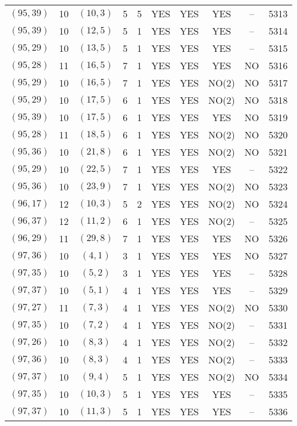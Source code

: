 \begin{longtable}{|c|c|c|c|c|c|c|c|c|c|}
$(95, 39)$ & 10 & $(10, 3)$ & 5 & 5 & YES & YES & YES & -- & 5313\\
$(95, 39)$ & 10 & $(12, 5)$ & 5 & 1 & YES & YES & YES & -- & 5314\\
$(95, 29)$ & 10 & $(13, 5)$ & 5 & 1 & YES & YES & YES & -- & 5315\\
$(95, 28)$ & 11 & $(16, 5)$ & 7 & 1 & YES & YES & YES & NO & 5316\\
$(95, 29)$ & 10 & $(16, 5)$ & 7 & 1 & YES & YES & NO(2) & NO & 5317\\
$(95, 29)$ & 10 & $(17, 5)$ & 6 & 1 & YES & YES & NO(2) & NO & 5318\\
$(95, 39)$ & 10 & $(17, 5)$ & 6 & 1 & YES & YES & YES & NO & 5319\\
$(95, 28)$ & 11 & $(18, 5)$ & 6 & 1 & YES & YES & NO(2) & NO & 5320\\
$(95, 36)$ & 10 & $(21, 8)$ & 6 & 1 & YES & YES & NO(2) & NO & 5321\\
$(95, 29)$ & 10 & $(22, 5)$ & 7 & 1 & YES & YES & YES & -- & 5322\\
$(95, 36)$ & 10 & $(23, 9)$ & 7 & 1 & YES & YES & NO(2) & NO & 5323\\
$(96, 17)$ & 12 & $(10, 3)$ & 5 & 2 & YES & YES & NO(2) & NO & 5324\\
$(96, 37)$ & 12 & $(11, 2)$ & 6 & 1 & YES & YES & NO(2) & -- & 5325\\
$(96, 29)$ & 11 & $(29, 8)$ & 7 & 1 & YES & YES & YES & NO & 5326\\
$(97, 36)$ & 10 & $(4, 1)$ & 3 & 1 & YES & YES & YES & NO & 5327\\
$(97, 35)$ & 10 & $(5, 2)$ & 3 & 1 & YES & YES & YES & -- & 5328\\
$(97, 37)$ & 10 & $(5, 1)$ & 4 & 1 & YES & YES & YES & -- & 5329\\
$(97, 27)$ & 11 & $(7, 3)$ & 4 & 1 & YES & YES & NO(2) & NO & 5330\\
$(97, 35)$ & 10 & $(7, 2)$ & 4 & 1 & YES & YES & NO(2) & -- & 5331\\
$(97, 26)$ & 10 & $(8, 3)$ & 4 & 1 & YES & YES & NO(2) & -- & 5332\\
$(97, 36)$ & 10 & $(8, 3)$ & 4 & 1 & YES & YES & NO(2) & -- & 5333\\
$(97, 37)$ & 10 & $(9, 4)$ & 5 & 1 & YES & YES & NO(2) & NO & 5334\\
$(97, 35)$ & 10 & $(10, 3)$ & 5 & 1 & YES & YES & YES & -- & 5335\\
$(97, 37)$ & 10 & $(11, 3)$ & 5 & 1 & YES & YES & YES & -- & 5336\\

\end{longtable}
